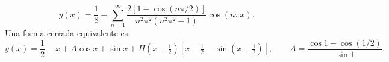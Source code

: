 \[y(x)=\frac18-\sum_{n=1}^\infty\frac{2[1-\cos(n\pi/2)]}{n^2\pi^2(n^2\pi^2-1)}\cos(n\pi x).\]
Una forma cerrada equivalente es
\[y(x)=\frac12-x+A\cos x+\sin x+H(x-\tfrac12)[x-\tfrac12-\sin(x-\tfrac12)],\qquad A=\frac{\cos1-\cos(1/2)}{\sin1}.\]

